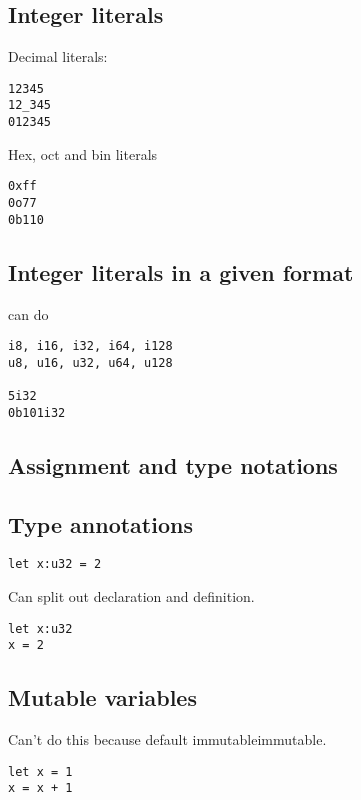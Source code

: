 
\subsection{Integer literals}

Decimal literals:

\begin{verbatim}
12345
12_345
012345
\end{verbatim}

Hex, oct and bin literals

\begin{verbatim}
0xff
0o77
0b110
\end{verbatim}

\subsection{Integer literals in a given format}

can do 
\begin{verbatim}
i8, i16, i32, i64, i128
u8, u16, u32, u64, u128

5i32
0b101i32

\end{verbatim}


\subsection{Assignment and type notations}

\subsection{Type annotations}

\begin{verbatim}
let x:u32 = 2
\end{verbatim}

Can split out declaration and definition.

\begin{verbatim}
let x:u32
x = 2
\end{verbatim}

\subsection{Mutable variables}

Can't do this because default immutableimmutable.
\begin{verbatim}
let x = 1
x = x + 1
\end{verbatim}


